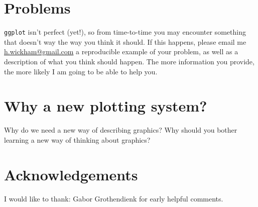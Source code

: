 \section{Problems}\label{sec:problems}

{\tt ggplot} isn't perfect (yet!), so from time-to-time you may encounter something that doesn't way the way you think it should.  If this happens, please email me \href{mailto:h.wickham@gmail.com}{h.wickham@gmail.com} a reproducible example of your problem, as well as a description of what you think should happen.  The more information you provide, the more likely I am going to be able to help you.



\section{Why a new plotting system?}\label{sec:why_a_new_plotting_system_} 

Why do we need a new way of describing graphics?  Why should you bother learning a new way of thinking about graphics?

\section{Acknowledgements}\label{sec:acknolwedgements}

I would like to thank: Gabor Grothendienk for early helpful comments.


